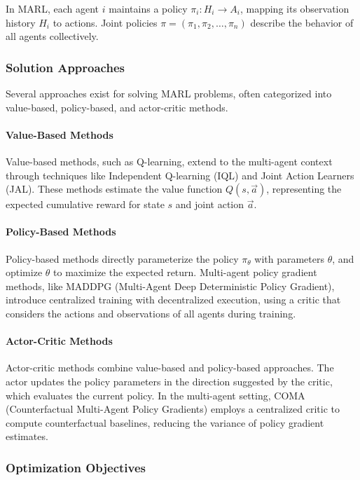 \documentclass[conference]{IEEEtran}
\begin{document}
In MARL, each agent $i$ maintains a policy $\pi_i: H_i \rightarrow A_i$, mapping its observation history $H_i$ to actions. Joint policies $\pi = (\pi_1, \pi_2, \ldots, \pi_n)$ describe the behavior of all agents collectively.

\subsubsection{Solution Approaches}

Several approaches exist for solving MARL problems, often categorized into value-based, policy-based, and actor-critic methods.

\paragraph{Value-Based Methods}

Value-based methods, such as Q-learning, extend to the multi-agent context through techniques like Independent Q-learning (IQL) and Joint Action Learners (JAL). These methods estimate the value function $Q(s, \vec{a})$, representing the expected cumulative reward for state $s$ and joint action $\vec{a}$.

\paragraph{Policy-Based Methods}

Policy-based methods directly parameterize the policy $\pi_{\theta}$ with parameters $\theta$, and optimize $\theta$ to maximize the expected return. Multi-agent policy gradient methods, like MADDPG (Multi-Agent Deep Deterministic Policy Gradient), introduce centralized training with decentralized execution, using a critic that considers the actions and observations of all agents during training.

\paragraph{Actor-Critic Methods}

Actor-critic methods combine value-based and policy-based approaches. The actor updates the policy parameters in the direction suggested by the critic, which evaluates the current policy. In the multi-agent setting, COMA (Counterfactual Multi-Agent Policy Gradients) employs a centralized critic to compute counterfactual baselines, reducing the variance of policy gradient estimates.

\subsubsection{Optimization Objectives}
\end{document}
